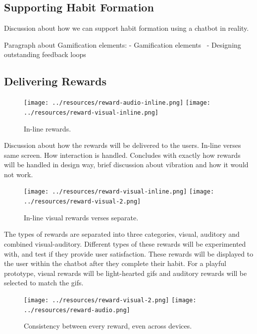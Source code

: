 \subsection{Supporting Habit Formation}

Discussion about how we can support habit formation using a chatbot in reality.

Paragraph about Gamification elements:
- Gamification elements~\cite{article_free_to_play_making_money_from_games_you_give_away}
- Designing outstanding feedback loops~\cite{website_how_to_design_feedback_loops}


\subsection{Delivering Rewards}

\begin{figure}[ht]
  \centering
  \texttt{[image: ../resources/reward-audio-inline.png]}
  \hspace{10px}
  \texttt{[image: ../resources/reward-visual-inline.png]}
  \caption{In-line rewards.}
  \label{fig:rewards_inline}
\end{figure}

Discussion about how the rewards will be delivered to the users. In-line verses same screen. How interaction is handled. Concludes with exactly how rewards will be handled in design way, brief discussion about vibration and how it would not work.

\begin{figure}[ht]
  \centering
  \texttt{[image: ../resources/reward-visual-inline.png]}
  \hspace{10px}
  \texttt{[image: ../resources/reward-visual-2.png]}
  \caption{In-line visual rewards verses separate.}
  \label{fig:rewards_inline_v_website}
\end{figure}

The types of rewards are separated into three categories, visual, auditory and combined visual-auditory. Different types of these rewards will be experimented with,
and test if they provide user satisfaction. These rewards will be displayed to the user within the chatbot after they complete their habit.
For a playful prototype, visual rewards will be light-hearted gifs and auditory rewards will be selected to match the gifs.

\begin{figure}[ht]
  \centering
  \texttt{[image: ../resources/reward-visual-2.png]}
  \hspace{10px}
  \texttt{[image: ../resources/reward-audio.png]}
  \caption{Consistency between every reward, even across devices.}
  \label{fig:rewards_consistency}
\end{figure}

